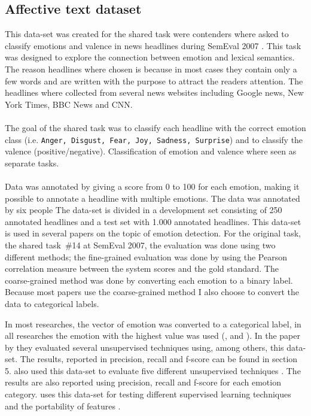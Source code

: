 \documentclass[11pt]{article}
\begin{document}
\subsection{Affective text dataset}
This data-set was created for the shared task were contenders where asked to classify emotions and valence in news headlines during SemEval 2007 \cite{strapparava2007semeval}. This task was designed to explore the connection between emotion and lexical semantics. The reason headlines where chosen is because  in most cases they contain only a few words and are written with the purpose to attract the readers attention. The headlines where collected from several news websites including Google news, New York Times, BBC News and CNN. \\ \\
The goal of the shared task was to classify each headline with the correct emotion class (i.e. \texttt{Anger, Disgust, Fear, Joy, Sadness, Surprise}) and to classify the valence (positive/negative). Classification of emotion and valence where seen as separate tasks. \\ \\
Data was annotated by giving a score from 0 to 100 for each emotion, making it possible to annotate a headline with multiple emotions. The data was annotated by six people
The data-set is divided in a development set consisting of 250 annotated headlines and a test set with 1.000 annotated headlines.
This data-set is used in several papers on the topic of emotion detection. For the original task, the shared task~\#14 at SemEval 2007, \cite{strapparava2007semeval} the evaluation was done using two different methods; the fine-grained evaluation was done by using the Pearson correlation measure between the system scores and the gold standard. The coarse-grained method was done by converting each emotion to a binary label. Because most papers use the coarse-grained method I also choose to convert the data to categorical labels.

In most researches, the vector of emotion was converted to a categorical label, in all researches the emotion with the highest value was used (\cite{chaffar2011using}, \cite{calvo2013emotions} and \cite{kim2010evaluation}).
In the paper by \cite{kim2010evaluation} they evaluated several unsupervised techniques using, among others, this data-set. The results, reported in precision, recall and f-score can be found in section 5.  also used this data-set to evaluate five different unsupervised techniques . The results are also reported using precision, recall and f-score for each emotion category.  uses this data-set for testing different supervised learning techniques and the portability of features \cite{mohammad:2012:NAACL-HLT}.
\end{document}
